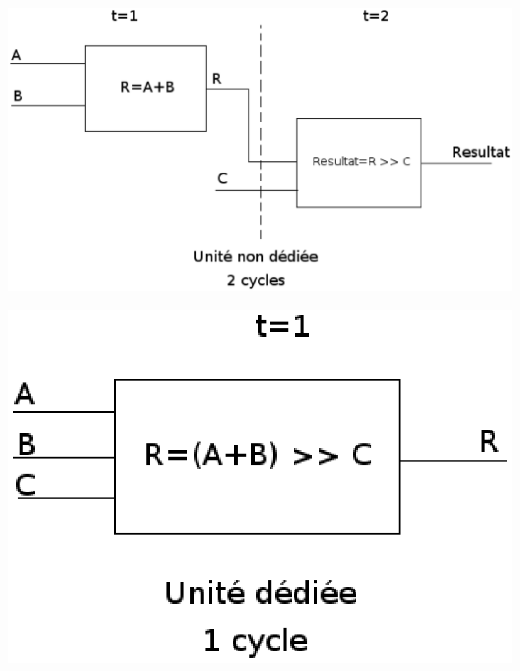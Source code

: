 \begin{center} \includegraphics[scale=0.4]{bloc2.eps}

    \includegraphics[scale=0.4]{bloc1.eps}

\end{center}
